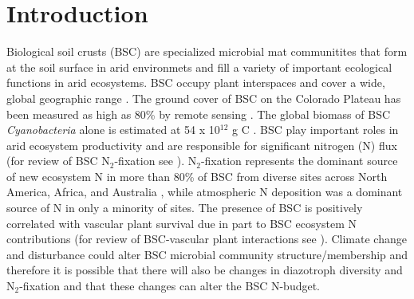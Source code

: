 \section{Introduction}
Biological soil crusts (BSC) are specialized microbial mat communitites that form at the soil surface in arid environmets and fill a variety of important ecological functions in arid ecosystems. BSC occupy plant interspaces and cover a
wide, global geographic range \citep{garcia2003estimates}. The ground cover of
BSC on the Colorado Plateau has been measured as high as 80\% by remote sensing
\citep{karnieli2001}. The global biomass of BSC \textit{Cyanobacteria} alone is
estimated at 54 x 10$^{12}$ g C \citep{garcia2003estimates}. BSC play important
roles in arid ecosystem productivity and are responsible for significant
nitrogen (N) flux (for review of BSC N$_{2}$-fixation see \citet{belnap2003}).
N$_{2}$-fixation represents the dominant source of new ecosystem N in more than 80\%
of BSC from diverse sites across North America, Africa, and Australia 
\citep{Evans_1999}, while atmospheric N deposition was a dominant source of N
in only a minority of sites. The presence of BSC is positively correlated with
vascular plant survival due in part to BSC ecosystem N contributions (for
review of BSC-vascular plant interactions see \citet{BelnapVascular}). Climate
change and disturbance could alter BSC microbial community structure/membership
and therefore it is possible that there will also be changes in diazotroph diversity
and N$_{2}$-fixation and that these changes can alter the BSC N-budget.

